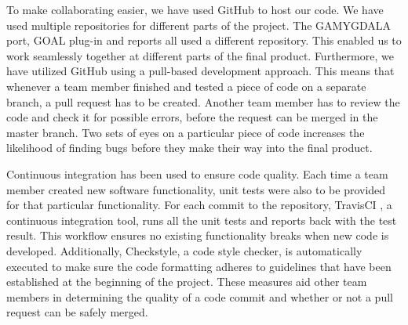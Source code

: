 To make collaborating easier, we have used GitHub \citep{gh} to host our code. We have used multiple repositories for different parts of the project. The GAMYGDALA port, GOAL plug-in and reports all used a different repository. This enabled us to work seamlessly together at different parts of the final product. Furthermore, we have utilized GitHub using a pull-based development approach. This means that whenever a team member finished and tested a piece of code on a separate branch, a pull request has to be created. Another team member has to review the code and check it for possible errors, before the request can be merged in the master branch. Two sets of eyes on a particular piece of code increases the likelihood of finding bugs before they make their way into the final product. 

Continuous integration has been used to ensure code quality. Each time a team member created new software functionality, unit tests were also to be provided for that particular functionality. For each commit to the repository, TravisCI \citep{travis}, a continuous integration tool, runs all the unit tests and reports back with the test result. This workflow ensures no existing functionality breaks when new code is developed. Additionally, Checkstyle, a code style checker, is automatically executed to make sure the code formatting adheres to guidelines that have been established at the beginning of the project. These measures aid other team members in determining the quality of a code commit and whether or not a pull request can be safely merged.